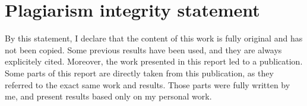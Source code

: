 \newpage
\section{Plagiarism integrity statement}
    By this statement, I declare that the content of this work is fully original and has not been copied. 
    Some previous results have been used, and they are always explicitely cited. 
    Moreover, the work presented in this report led to a publication. 
    Some parts of this report are directly taken from this publication, as they referred to the exact same work and results. 
    Those parts were fully written by me, and present results based only on my personal work. 
\newpage